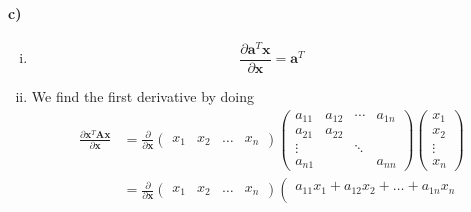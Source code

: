 \documentclass[12pt]{article}
\begin{document}
\paragraph{c)}

\begin{enumerate}[i)]
        \item
                \[\frac{\partial\mathbf{a}^T\mathbf{x}}{\partial\mathbf{x}}=\mathbf{a}^T\]
        \item We find the first derivative by doing
                \begin{align*}
                        \frac{\partial\mathbf{x}^T\mathbf{Ax}}{\partial\mathbf{x}}&=\frac{\partial}{\partial\mathbf{x}}
                                \left(\begin{matrix}
                                        x_1 & x_2 & \ldots & x_n
                                \end{matrix}\right)
                                \left(\begin{matrix}
                                        a_{11} & a_{12} & \cdots & a_{1n}\\
                                        a_{21} & a_{22} &        &\\
                                        \vdots &        & \ddots &\\
                                        a_{n1} &        &        & a_{nn}
                                \end{matrix}\right)
                                \left(\begin{matrix}
                                        x_1\\
                                        x_2\\
                                        \vdots\\
                                        x_n
                                \end{matrix}\right)\\
                        &=\frac{\partial}{\partial\mathbf{x}}
                                \left(\begin{matrix}
                                        x_1 & x_2 & \ldots & x_n
                                \end{matrix}\right)
                                \left(\begin{matrix}
                                        a_{11}x_1+a_{12}x_2+\ldots+a_{1n}x_n\\

\end{matrix}
\end{align*}
\end{enumerate}
\end{document}
